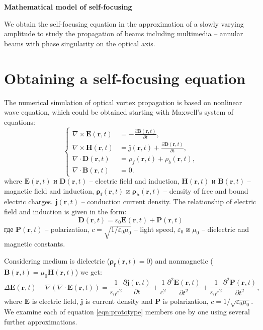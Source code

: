 \documentclass[a4paper, 12pt]{article}
\begin{document}
\begin{center}
\Huge{\textbf{Mathematical model of self-focusing}}
\end{center}

We obtain the self-focusing equation in the approximation of a slowly varying amplitude to study the propagation of beams including multimedia -- annular beams with phase singularity on the optical axis.

\section{Obtaining a self-focusing equation}

The numerical simulation of optical vortex propagation is based on nonlinear wave equation, which could be obtained starting with Maxwell's system of equations:
\begin{equation}
\label{eqn:maxwell}
\left\{
\begin{aligned}
\nabla \times \mathbf{E}(\mathbf{r}, t) &= -\frac{\partial \mathbf{B}(\mathbf{r}, t)}{\partial t},\\
\nabla \times \mathbf{H}(\mathbf{r}, t) &= \mathbf{j}(\mathbf{r}, t) + \frac{\partial \mathbf{D}(\mathbf{r}, t)}{\partial t},\\[0.2cm]
\nabla \cdot \mathbf{D}(\mathbf{r}, t) &= \rho_f (\mathbf{r}, t) + \rho_b (\mathbf{r}, t), \\[0.3cm]
\nabla \cdot \mathbf{B}(\mathbf{r}, t) &= 0.
\end{aligned}
\right.
\end{equation}
where $\mathbf{E}(\mathbf{r}, t)$ и $\mathbf{D}(\mathbf{r}, t)$ -- electric field and induction, $\mathbf{H}(\mathbf{r}, t)$ и $\mathbf{B}(\mathbf{r}, t)$ -- magnetic field and induction, $\mathbf{\rho_f}(\mathbf{r}, t)$ и $\mathbf{\rho_b}(\mathbf{r}, t)$ -- density of free and bound electric charges. $\mathbf{j}(\mathbf{r}, t)$ -- conduction current density. The relationship of electric field and induction is given in the form:
\begin{equation}
\label{eqn:D}
\mathbf{D}(\mathbf{r}, t) = \varepsilon_0 \mathbf{E}(\mathbf{r}, t) + \mathbf{P}(\mathbf{r}, t)
\end{equation}
где $\mathbf{P}(\mathbf{r}, t)$ -- polarization, $c = \sqrt{1 / \varepsilon_0 \mu_0}$ -- light speed, $\varepsilon_0$ и $\mu_0$ -- dielectric and magnetic constants.

Considering medium is dielectric ($\mathbf{\rho_f}(\mathbf{r}, t) = 0$) and nonmagnetic ($\mathbf{B}(\mathbf{r}, t) = \mu_0 \mathbf{H}(\mathbf{r}, t)$) 
we get:
\begin{equation}
\label{eqn:prototype}
\Delta \mathbf{E}(\mathbf{r}, t) - \nabla (\nabla \cdot \mathbf{E}(\mathbf{r}, t)) =  \frac1{\varepsilon_0 c^2} \frac{\partial \mathbf{j}(\mathbf{r}, t)}{\partial t} + \frac1{c^2} \frac{\partial^2 \mathbf{E}(\mathbf{r}, t)}{\partial t^2} + \frac1{\varepsilon_0 c^2} \frac{\partial^2 \mathbf{P}(\mathbf{r}, t)}{\partial t^2},
\end{equation}
where $\mathbf{E}$ is electric field, $\mathbf{j}$ is current density and $\mathbf{P}$ is polarization, $c=1/\sqrt{\varepsilon_0 \mu_0}$. We examine each of equation \eqref{eqn:prototype} members one by one using several further approximations. 
\end{document}
